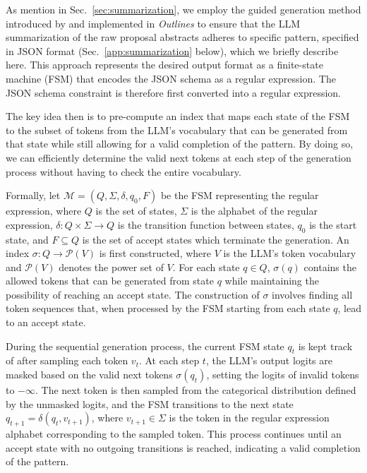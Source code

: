 \documentclass{article} %
\newcommand{\package}[1]{\textsl{#1}\xspace}
\begin{document}
As mention in Sec.~\ref{sec:summarization}, we employ the guided generation method introduced by \citet{willard2023efficient} and implemented in \package{Outlines} to ensure that the LLM summarization of the raw proposal abstracts adheres to specific pattern, specified in JSON format (Sec.~\ref{app:summarization} below), which we briefly describe here. This approach represents the desired output format as a finite-state machine (FSM) that encodes the JSON schema as a regular expression. The JSON schema constraint is therefore first converted into a regular expression.

The key idea then is to pre-compute an index that maps each state of the FSM to the subset of tokens from the LLM's vocabulary that can be generated from that state while still allowing for a valid completion of the pattern. By doing so, we can efficiently determine the valid next tokens at each step of the generation process without having to check the entire vocabulary.

Formally, let $\mathcal{M} = (Q, \Sigma, \delta, q_0, F)$ be the FSM representing the regular expression, where $Q$ is the set of states, $\Sigma$ is the alphabet of the regular expression, $\delta: Q \times \Sigma \rightarrow Q$ is the transition function between states, $q_0$ is the start state, and $F\subseteq Q$ is the set of accept states which terminate the generation. An index $\sigma: Q \rightarrow \mathcal{P}(V)$ is first constructed, where $V$ is the LLM's token vocabulary and $\mathcal{P}(V)$ denotes the power set of $V$. For each state $q \in Q$, $\sigma(q)$ contains the allowed tokens that can be generated from state $q$ while maintaining the possibility of reaching an accept state. The construction of $\sigma$ involves finding all token sequences that, when processed by the FSM starting from each state $q$, lead to an accept state.

During the sequential generation process, the current FSM state $q_t$ is kept track of after sampling each token $v_t$. At each step $t$, the LLM's output logits are masked based on the valid next tokens $\sigma(q_t)$, setting the logits of invalid tokens to $-\infty$. The next token is then sampled from the categorical distribution defined by the unmasked logits, and the FSM transitions to the next state $q_{t+1} = \delta(q_t, v_{t+1})$, where $v_{t+1} \in \Sigma$ is the token in the regular expression alphabet corresponding to the sampled token. This process continues until an accept state with no outgoing transitions is reached, indicating a valid completion of the pattern.
\end{document}
